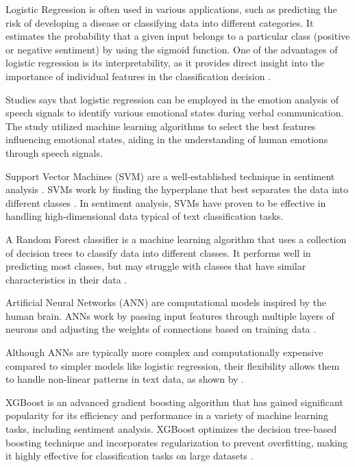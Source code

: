 Logistic Regression is often used in various applications, such as predicting the risk of developing a disease or classifying data into different categories. It estimates the probability that a given input belongs to a particular class (positive or negative sentiment) by using the sigmoid function. One of the advantages of logistic regression is its interpretability, as it provides direct insight into the importance of individual features in the classification decision \cite{Pathan2018}.

Studies says that logistic regression can be employed in the emotion analysis of speech signals to identify various emotional states during verbal communication. The study utilized machine learning algorithms to select the best features influencing emotional states, aiding in the understanding of human emotions through speech signals\cite{Poovammal2016}.

Support Vector Machines (SVM) are a well-established technique in sentiment analysis \cite{Mahmood2020}. SVMs work by finding the hyperplane that best separates the data into different classes \cite{Gillet2007}. In sentiment analysis, SVMs have proven to be effective in handling high-dimensional data typical of text classification tasks.

A Random Forest classifier is a machine learning algorithm that uses a collection of decision trees to classify data into different classes. It performs well in predicting most classes, but may struggle with classes that have similar characteristics in their data \cite{Senturk2023}.

Artificial Neural Networks (ANN) are computational models inspired by the human brain. ANNs work by passing input features through multiple layers of neurons and adjusting the weights of connections based on training data \cite{Walczak2003}.

Although ANNs are typically more complex and computationally expensive compared to simpler models like logistic regression, their flexibility allows them to handle non-linear patterns in text data, as shown by \cite{Collobert2011}.

XGBoost is an advanced gradient boosting algorithm that has gained significant popularity for its efficiency and performance in a variety of machine learning tasks, including sentiment analysis. XGBoost optimizes the decision tree-based boosting technique and incorporates regularization to prevent overfitting, making it highly effective for classification tasks on large datasets \cite{Bentejac2019}.

